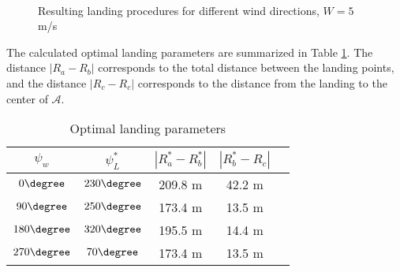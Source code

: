 \begin{figure}
    
    \\
    \caption{Resulting landing procedures for different wind directions, $W=5$ m/s}
    \label{fig:result}
\end{figure}

The calculated optimal landing parameters are summarized in Table \ref{tab:opt_land_param}. The distance $|R_a-R_b|$ corresponds to the total distance between the landing points,
and the distance $|R_c-R_c|$ corresponds to the distance from the landing to the center of $\mathcal{A}$.

\begin{table}
    \begin{center}
        \begin{tabular}{|c|c|c|c|c|}
            \hline
            $\psi_w$ & $\psi_L^*$ & $|R_a^*-R_b^*|$ & $|R_b^*-R_c|$\\
            \hline
            $0\degree$ & $230\degree$ & 209.8 m & 42.2 m \\
            \hline
            $90\degree$ & $250\degree$ & 173.4 m & 13.5 m \\
            \hline
            $180\degree$ & $320\degree$ & 195.5 m & 14.4 m  \\
            \hline
            $270\degree$ & $70\degree$ & 173.4 m & 13.5 m  \\
            \hline
        \end{tabular}
    \end{center}
    \caption{Optimal landing parameters}
    \label{tab:opt_land_param}
\end{table}